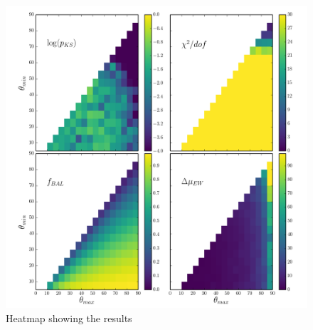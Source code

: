 \begin{figure} %
\centering
\includegraphics[width=1.0\textwidth]{figures/ewpaper/mesh4_ew_o3_max_sdss.png}
\caption
{
Heatmap showing the results 
}
\label{fig:contour}
\end{figure} %

